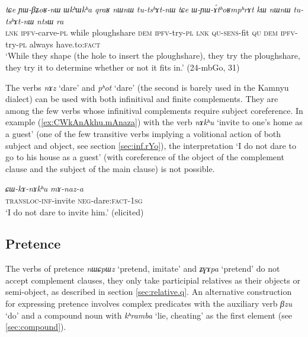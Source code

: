 \documentclass[oneside,a4paper,11pt]{article}
\newcommand{\ipa}[1]{\textit{\phon#1}}
\newcommand{\jpg}[2]{\ipa{#1} `#2'}
\newcommand{\refb}[1]{(\ref{#1})}
\begin{document}
\begin{exe}
\ex \label{ex:WYAthoRmphrAt}
\gll \ipa{tɕe} 	\ipa{ɲɯ-βʑoʁ-nɯ} 	\ipa{ɯkʰɯkʰa} 	\ipa{qraʁ} 	\ipa{nɯnɯ} 	\ipa{tu-tsʰɤt-nɯ} 	\ipa{tɕe} 	\ipa{ɯ-ɲɯ-ɤ́tʰoʁmpʰrɤt} 	\ipa{kɯ} 	\ipa{nɯnɯ} 	\ipa{tu-tsʰɤt-nɯ} 	\ipa{ntsɯ} 	\ipa{ra}   	 \\
\textsc{lnk} \textsc{ipfv}-carve-\textsc{pl} while ploughshare \textsc{dem} \textsc{ipfv}-try-\textsc{pl} \textsc{lnk} \textsc{qu-sens}-fit \textsc{qu} \textsc{dem} \textsc{ipfv}-try-\textsc{pl} always have.to:\textsc{fact} \\
 \glt `While they shape (the hole to insert the ploughshare), they try the ploughshare, they try it to determine whether or not it fits in.' (24-mbGo, 31)
\end{exe}

The verbs \jpg{nɤz}{dare} and \jpg{pʰot}{dare} (the second is barely used in the Kamnyu dialect) can be used with both infinitival and finite complements. They are among the few verbs whose infinitival complements require subject coreference. In example \refb{ex:CWkAnAkhu.mAnaza}  with the verb  \jpg{nɤkʰu}{invite to one's home as a guest} (one of the few transitive verbs implying a volitional action of both subject and object, see section \ref{sec:inf.rYo}), the interpretation `I do not dare to go to his house as a guest' (with coreference of the object of the complement clause and the subject of the main clause) is not possible.

\begin{exe}
\ex \label{ex:CWkAnAkhu.mAnaza}
\gll 
\ipa{ɕɯ-kɤ-nɤkʰu} \ipa{mɤ-naz-a} \\
\textsc{transloc-inf}-invite \textsc{neg}-dare:\textsc{fact-1sg} \\
\glt `I do not dare to invite him.' (elicited)
\end{exe}

\subsection{Pretence} \label{sec:pretence}
The verbs of pretence \jpg{nɯɕpɯz}{pretend, imitate} and \jpg{ʑɣɤpa}{pretend} do not accept complement clauses, they only take participial relatives as their objects or semi-object, as described in section \ref{sec:relative.q}. An alternative construction for expressing pretence involves complex predicates with the auxiliary verb \jpg{βzu}{do} and a compound noun with \jpg{kʰramba}{lie, cheating} as the first element (see \ref{sec:compound}).
\end{document}
